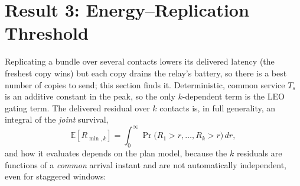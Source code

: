 \documentclass[twocolumn,3p,times,procedia]{elsarticle}
\theoremstyle{plain}
\theoremstyle{remark}
\newcommand{\E}{\mathbb{E}}
\begin{document}
\section{Result 3: Energy--Replication Threshold}\label{sec:r3}
Replicating a bundle over several contacts lowers its delivered latency
(the freshest copy wins) but each copy drains the relay's battery, so
there is a best number of copies to send; this section finds it. Deterministic, common service $T_s$ is an additive constant in
the peak, so the only $k$-dependent term is the LEO gating term. The
delivered residual over $k$ contacts is, in full generality, an integral
of the \emph{joint} survival,
\begin{equation}\label{eq:rminjoint}
\E[R_{\min,k}]=\int_0^\infty\Pr\bigl(R_1>r,\dots,R_k>r\bigr)\,dr,
\end{equation}
and how it evaluates depends on the plan model, because the $k$
residuals are functions of a \emph{common} arrival instant and are not
automatically independent, even for staggered windows:
\end{document}
